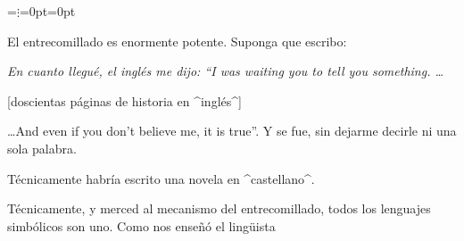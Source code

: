 \goodbreak
{}=\hbox{$\vdots$}=0pt=0pt

El entrecomillado es enormente potente. Suponga que
escribo:\newline
\newline
 {\sl En cuanto llegué, el inglés me dijo:
  ``I was waiting you to tell you something. \dots\newline
 \centerline{}
 \centerline{\rm[doscientas páginas de historia en ^inglés^]}
 \centerline{\raise-2pt}
 \dots And even if you don't believe me, it is true''.
 Y se fue, sin dejarme decirle ni una sola palabra.}\newline
\newline
Técnicamente habría escrito una novela en ^castellano^.

Técnicamente, y merced al mecanismo del entrecomillado, todos los
lenguajes simbólicos son uno. Como nos enseñó el lingüista
